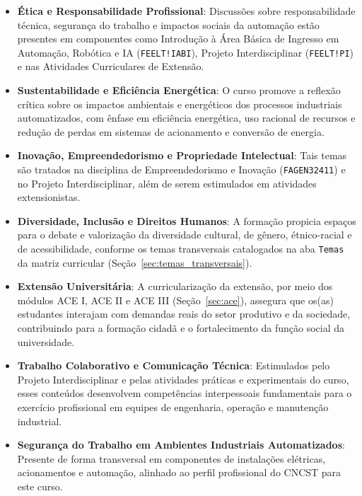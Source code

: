 \begin{itemize}
\item \textbf{Ética e Responsabilidade Profissional}: Discussões sobre responsabilidade técnica, segurança do trabalho e impactos sociais da automação estão presentes em componentes como Introdução à Área Básica de Ingresso em Automação, Robótica e IA (\texttt{FEELT!IABI}), Projeto Interdisciplinar (\texttt{FEELT!PI}) e nas Atividades Curriculares de Extensão.

\item \textbf{Sustentabilidade e Eficiência Energética}: O curso promove a reflexão crítica sobre os impactos ambientais e energéticos dos processos industriais automatizados, com ênfase em eficiência energética, uso racional de recursos e redução de perdas em sistemas de acionamento e conversão de energia.

\item \textbf{Inovação, Empreendedorismo e Propriedade Intelectual}: Tais temas são tratados na disciplina de Empreendedorismo e Inovação (\texttt{FAGEN32411}) e no Projeto Interdisciplinar, além de serem estimulados em atividades extensionistas.

\item \textbf{Diversidade, Inclusão e Direitos Humanos}: A formação propicia espaços para o debate e valorização da diversidade cultural, de gênero, étnico-racial e de acessibilidade, conforme os temas transversais catalogados na aba \texttt{Temas} da matriz curricular (Seção~\ref{sec:temas_transversais}).

\item \textbf{Extensão Universitária}: A curricularização da extensão, por meio dos módulos ACE I, ACE II e ACE III (Seção~\ref{sec:ace}), assegura que os(as) estudantes interajam com demandas reais do setor produtivo e da sociedade, contribuindo para a formação cidadã e o fortalecimento da função social da universidade.

\item \textbf{Trabalho Colaborativo e Comunicação Técnica}: Estimulados pelo Projeto Interdisciplinar e pelas atividades práticas e experimentais do curso, esses conteúdos desenvolvem competências interpessoais fundamentais para o exercício profissional em equipes de engenharia, operação e manutenção industrial.

\item \textbf{Segurança do Trabalho em Ambientes Industriais Automatizados}: Presente de forma transversal em componentes de instalações elétricas, acionamentos e automação, alinhado ao perfil profissional do CNCST para este curso.

\end{itemize}

